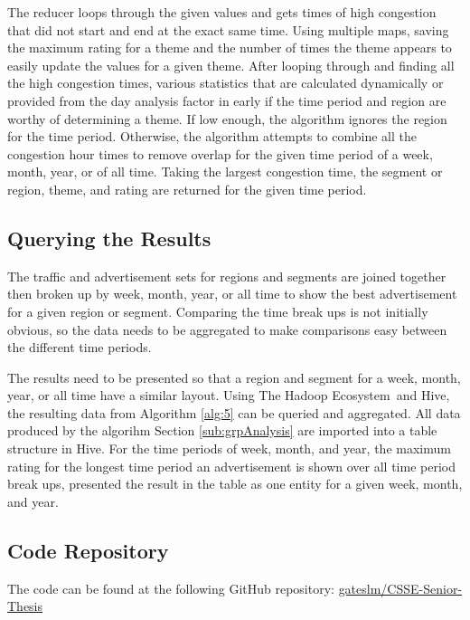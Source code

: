 \documentclass[titlepage,twocolumn]{article}
\newcommand{\HadoopEcosystem}{Hadoop Ecosystem}
\begin{document}
\par The reducer loops through the given values and gets times of high congestion that did not start and end at the exact same time. Using multiple maps, saving the maximum rating for a theme and the number of times the theme appears to easily update the values for a given theme. After looping through and finding all the high congestion times, various statistics that are calculated dynamically or provided from the day analysis factor in early if the time period and region are worthy of determining a theme. If low enough, the algorithm ignores the region for the time period. Otherwise, the algorithm attempts to combine all the congestion hour times to remove overlap for the given time period of a week, month, year, or of all time. Taking the largest congestion time, the segment or region, theme, and rating are returned for the given time period. 

\subsection{Querying the Results}

\par The traffic and advertisement sets for regions and segments are joined together then broken up by week, month, year, or all time to show the best advertisement for a given region or segment. Comparing the time break ups is not initially obvious, so the data needs to be aggregated to make comparisons easy between the different time periods. 

\par The results need to be presented so that a region and segment for a week, month, year, or all time have a similar layout. Using The \HadoopEcosystem\ and Hive, the resulting data from Algorithm \ref{alg:5} can be queried and aggregated. All data produced by the algorihm Section \ref{sub:grpAnalysis} are imported into a table structure in Hive. For the time periods of week, month, and year, the maximum rating for the longest time period an advertisement is shown over all time period break ups, presented the result in the table as one entity for a given week, month, and year.

\subsection{Code Repository}
\label{sub:github}

\par The code can be found at the following GitHub repository: \href{https://github.com/gateslm/CSSE-Senior-Thesis}{gateslm/CSSE-Senior-Thesis}
\end{document}
